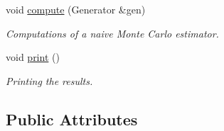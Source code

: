 \begin{DoxyCompactItemize}
void \mbox{\hyperlink{classmonte__carlo_a598c1fbac6b56ee278fd04bf6115b1d3}{compute}} (Generator \&gen)
\begin{DoxyCompactList}\small\item\em Computations of a naive Monte Carlo estimator. \end{DoxyCompactList}\item 
void \mbox{\hyperlink{classmonte__carlo_a5fb1de57e0f77deb8ff167589b9e8b9e}{print}} ()
\begin{DoxyCompactList}\small\item\em Printing the results. \end{DoxyCompactList}\end{DoxyCompactItemize}
\subsection*{Public Attributes}
